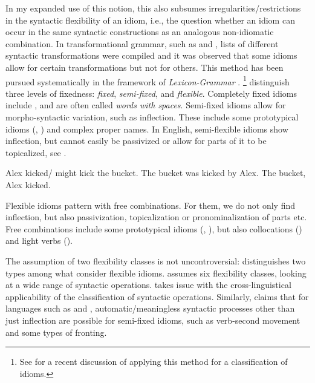\documentclass[output=paper]{langsci/langscibook}
\begin{document}
In my expanded use of this notion, this also subsumes irregularities/restrictions in the syntactic flexibility of an idiom, i.e., the question whether an idiom can occur in the same syntactic constructions as an analogous non-idiomatic combination. In transformational grammar, such as \cite{Weinreich:69} and \cite{Fraser:70}, lists of different syntactic transformations were compiled and it was observed that some idioms allow for certain transformations but not for others. This method has been pursued systematically in the framework of \emph{Lexicon-Grammar} \citep{Gross:75}.%
\footnote{See \cite{Laporte:18} for a recent discussion of applying this method for a classification of idioms.}
%
\cite{SBBCF2002a-ausgedruckt} distinguish three levels of fixedness: \emph{fixed}, \emph{semi-fixed}, and \emph{flexible}. 
Completely fixed idioms include ,  and are often called \emph{words with spaces}.
Semi-fixed idioms allow for morpho-syntactic variation, such as inflection. These include some prototypical idioms (, ) and complex proper names. In English, semi-flexible idioms show inflection, but cannot easily be passivized or allow for parts of it to be topicalized, see .

\eal \label{kick-ex} 
\ex Alex kicked/ might kick the bucket.
\ex *The bucket was kicked by Alex.
\ex *The bucket, Alex kicked.
\zl 



Flexible idioms pattern with free combinations. For them, we do not only find inflection, but also passivization, topicalization or pronominalization of parts etc. Free combinations include some prototypical idioms (, ), but also collocations () and light verbs ().

The assumption of two flexibility classes is not uncontroversial: 
\cite{Horn:03} distinguishes two types among what \cite{SBBCF2002a-ausgedruckt} consider flexible idioms. 
\cite{Fraser:70} assumes six flexibility classes, looking at a wide range of syntactic operations.
\cite{Ruwet:91} takes issue with the cross-linguistical applicability of the classification of syntactic operations. Similarly, \cite{Schenk:95} claims that for languages such as  and , automatic/meaningless syntactic processes other than just inflection are possible for semi-fixed idioms, such as verb-second movement and some types of fronting.
\end{document}
